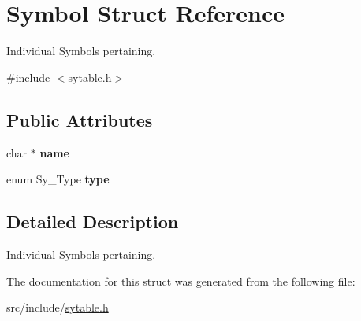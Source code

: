 \hypertarget{struct_symbol}{}\section{Symbol Struct Reference}
\label{struct_symbol}


Individual Symbols pertaining.  




{\ttfamily \#include $<$sytable.\+h$>$}

\subsection*{Public Attributes}
\begin{DoxyCompactItemize}
\item 
\mbox{\label{struct_symbol_aa9ba617cd9de17ed73148893a6c14606}} 
char $\ast$ {\bfseries name}
\item 
\mbox{\label{struct_symbol_ad00581c130351f6716135cca2acef5c8}} 
enum Sy\+\_\+\+Type {\bfseries type}
\end{DoxyCompactItemize}


\subsection{Detailed Description}
Individual Symbols pertaining. 

The documentation for this struct was generated from the following file\+:\begin{DoxyCompactItemize}
\item 
src/include/\mbox{\hyperlink{sytable_8h}{sytable.\+h}}\end{DoxyCompactItemize}
